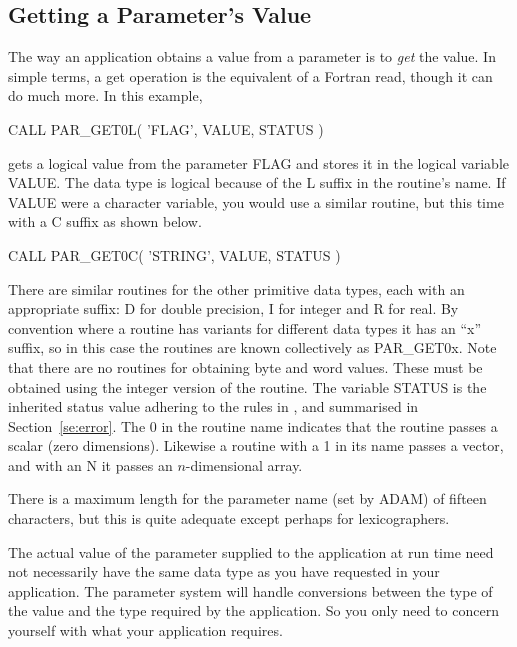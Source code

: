 \documentclass[twoside,11pt,nolof]{starlink}
\begin{document}
\subsection{Getting a Parameter's Value}

The way an application obtains a value from a parameter is to \textit{get\/} the value.  In simple terms, a get operation is the equivalent of
a Fortran read, though it can do much more.  In this example,

\begin{terminalv}
      CALL PAR_GET0L( 'FLAG', VALUE, STATUS )
\end{terminalv}

gets a logical value from the parameter FLAG and stores it in the
logical variable VALUE.  The data type is logical because of the L
suffix in the routine's name.  If VALUE were a character variable, you
would use a similar routine, but this time with a C suffix as shown below.

\begin{terminalv}
      CALL PAR_GET0C( 'STRING', VALUE, STATUS )
\end{terminalv}

There are similar routines for the other primitive data types, each with
an appropriate suffix: D for double precision, I for integer and R for
real.  By convention where a routine has variants for different data
types it has an ``x'' suffix, so in this case the routines are known
collectively as PAR\_GET0x.  Note that there are no routines for
obtaining byte and word values.  These must be obtained using the
integer version of the routine.  The variable STATUS is the inherited
status value adhering to the rules in
,
and summarised in
Section~\ref{se:error}.  The 0 in the routine name indicates that the
routine passes a scalar (zero dimensions).  Likewise a routine with a 1
in its name passes a vector, and with an N it passes an $n$-dimensional
array.

There is a maximum length for the parameter name (set by {\footnotesize
ADAM}) of fifteen characters, but this is quite adequate except
perhaps for lexicographers.

The actual value of the parameter supplied to the application at run
time need not necessarily have the same data type as you have requested
in your application. The parameter system will handle conversions
between the type of the value and the type required by the
application.  So you only need to concern yourself with what your
application requires.
\end{document}
